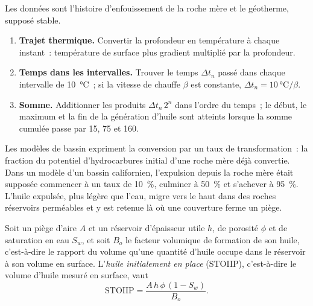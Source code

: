 \begin{method}\label{met:b2:energy-geology:tti}
Les données sont l'histoire d'enfouissement de la roche mère et le géotherme, supposé stable.
\begin{enumerate}
  \item \textbf{Trajet thermique.} Convertir la profondeur en température à chaque instant~: température de surface
        plus gradient multiplié par la profondeur.
  \item \textbf{Temps dans les intervalles.} Trouver le temps $\Delta t_n$ passé dans chaque intervalle de
        \qty{10}{\celsius}~; si la vitesse de chauffe $\beta$ est constante, $\Delta t_n = \qty{10}{\celsius}/\beta$.
  \item \textbf{Somme.} Additionner les produits $\Delta t_n\,2^n$ dans l'ordre du temps~; le début, le maximum
        et la fin de la génération d'huile sont atteints lorsque la somme cumulée passe par 15, 75 et 160.
\end{enumerate}
\end{method}

Les modèles de bassin expriment la conversion par un taux de transformation~: la fraction du potentiel
d'hydrocarbures initial d'une roche mère déjà convertie. Dans un modèle d'un bassin californien, l'expulsion
depuis la roche mère était supposée commencer à un taux de \qty{10}{\percent}, culminer à \qty{50}{\percent}
et s'achever à \qty{95}{\percent}. L'huile expulsée, plus légère que l'eau,
migre vers le haut dans des roches réservoirs perméables et y est retenue là où une couverture ferme un piège.

\begin{proposition}\label{prop:b2:energy-geology:volumetrics}
Soit un piège d'aire $A$ et un réservoir d'épaisseur utile $h$, de porosité $\phi$ et de saturation en eau
$S_w$, et soit $B_o$ le facteur volumique de formation de son huile, c'est-à-dire le rapport du volume qu'une quantité
d'huile occupe dans le réservoir à son volume en surface. L'\emph{huile initialement
en place} (STOIIP), c'est-à-dire le volume d'huile mesuré en surface, vaut
\begin{equation}
\mathrm{STOIIP} = \frac{A\,h\,\phi\,(1 - S_w)}{B_o} .
\label{eq:b2:energy-geology:stoiip}
\end{equation}
\end{proposition}

